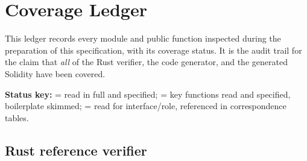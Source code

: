 \chapter{Coverage Ledger}
\label{ch:ledger}

This ledger records every module and public function inspected during the
preparation of this specification, with its coverage status. It is the
audit trail for the claim that \emph{all} of the Rust verifier, the code
generator, and the generated Solidity have been covered.

\textbf{Status key:}  = read in full and specified;
 = key functions read and specified, boilerplate skimmed;
 = read for interface/role, referenced in correspondence tables.

\section{Rust reference verifier}
\label{sec:ledger-rust}

